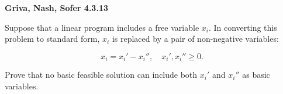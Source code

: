 \textbf{Griva, Nash, Sofer 4.3.13}

Suppose that a linear program includes a free variable $x_i$. In converting this problem to standard form, $x_i$ is
replaced by a pair of non-negative variables:

$$
x_i = x_i' - x_i'', \quad x_i', x_i'' \geq 0.
$$

Prove that no basic feasible solution can include both $x_i'$ and $x_i''$ as basic variables.

\begin{solution}
  \ \\
\end{solution}